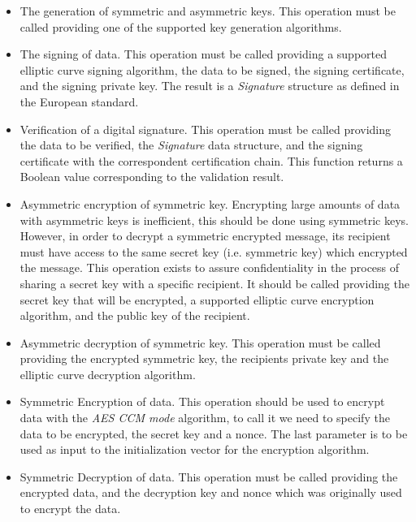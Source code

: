 \begin{itemize}
	\item The generation of symmetric and asymmetric keys. This operation must be called providing one of the supported key generation algorithms.
	\item The signing of data. This operation must be called providing a supported elliptic curve signing algorithm, the data to be signed, the signing certificate, and the signing private key. The result is a \textit{Signature} structure as defined in the European standard. 
	
	\item Verification of a digital signature. This operation must be called providing the data to be verified, the \textit{Signature} data structure, and the signing certificate with the correspondent certification chain. This function returns a Boolean value corresponding to the validation result. 
	
	\item Asymmetric encryption of symmetric key. Encrypting large amounts of data with asymmetric keys is inefficient, this should be done using symmetric keys. However, in order to decrypt a symmetric encrypted message, its recipient must have access to the same secret key (i.e. symmetric key) which encrypted the message. This operation exists to assure confidentiality in the process of sharing a secret key with a specific recipient. It should be called providing the secret key that will be encrypted, a supported elliptic curve encryption algorithm, and the public key of the recipient. 
	
	\item Asymmetric decryption of symmetric key. This operation must be called providing the encrypted symmetric key, the recipients private key and the elliptic curve decryption algorithm.
	
	\item Symmetric Encryption of data. This operation should be used to encrypt data with the \textit{AES CCM mode} algorithm, to call it we need to specify the data to be encrypted, the secret key and a nonce. The last parameter is to be used as input to the initialization vector for the encryption algorithm.
	 
	\item Symmetric Decryption of data. This operation must be called providing the encrypted data, and the decryption key and nonce which was originally used to encrypt the data. 

	
\end{itemize}

